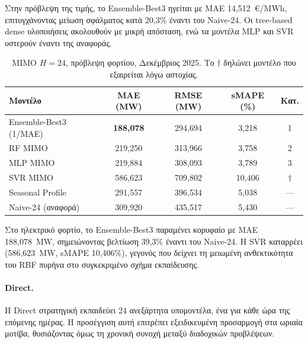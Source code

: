 Στην πρόβλεψη της τιμής, το Ensemble-Best3 ηγείται με MAE 14,512~€/MWh, επιτυγχάνοντας
μείωση σφάλματος κατά 20,3\% έναντι του Naive-24. Οι tree-based dense υλοποιήσεις
ακολουθούν με μικρή απόσταση, ενώ τα μοντέλα MLP και SVR υστερούν έναντι της αναφοράς.

\begin{table}[H]
  \centering
  \caption{MIMO $H=24$, πρόβλεψη φορτίου, Δεκέμβριος 2025. Το $\dagger$
           δηλώνει μοντέλο που εξαιρείται λόγω αστοχίας.}
  \label{tab:mimo_load_dec}
  \begin{tabular}{lcccc}
    \toprule
    \textbf{Μοντέλο} & \textbf{MAE (MW)} & \textbf{RMSE (MW)} & \textbf{sMAPE (\%)} & \textbf{Κατ.} \\
    \midrule
    Ensemble-Best3 (1/MAE) & \textbf{188,078} & 294,694 & 3,218 & 1 \\
    RF MIMO                & 219,250 & 313,966 & 3,758 & 2 \\
    MLP MIMO               & 219,884 & 308,093 & 3,789 & 3 \\
    SVR MIMO               & 586,623 & 709,802 & 10,406 & $\dagger$ \\
    \midrule
    Seasonal Profile       & 291,557 & 396,534 & 5,038 & --- \\
    Naive-24 (αναφορά)     & 309,920 & 435,517 & 5,430 & --- \\
    \bottomrule
  \end{tabular}
\end{table}

Στο ηλεκτρικό φορτίο, το Ensemble-Best3 παραμένει κορυφαίο με MAE 188,078~MW,
σημειώνοντας βελτίωση 39,3\% έναντι του Naive-24. Η SVR καταρρέει
(586,623~MW, sMAPE 10,406\%), γεγονός που δείχνει τη μειωμένη ανθεκτικότητα του
RBF πυρήνα στο συγκεκριμένο σχήμα εκπαίδευσης.

\paragraph{Direct.}
Η Direct στρατηγική εκπαιδεύει 24 ανεξάρτητα υπομοντέλα, ένα για κάθε ώρα της επόμενης
ημέρας. Η προσέγγιση αυτή επιτρέπει εξειδικευμένη προσαρμογή στα ωριαία μοτίβα,
θυσιάζοντας όμως τη χρονική συνοχή μεταξύ διαδοχικών προβλέψεων.

